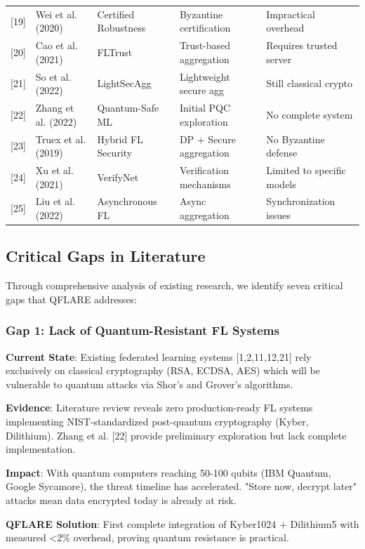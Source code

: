 \documentclass[12pt,a4paper]{article}
\begin{document}
\begin{table}[H]
\begin{tabular}{p{0.8cm}p{3.5cm}p{2.5cm}p{2cm}p{3cm}}
{[}19{]} & Wei et al. (2020) & Certified Robustness & Byzantine certification & Impractical overhead \\
{[}20{]} & Cao et al. (2021) & FLTrust & Trust-based aggregation & Requires trusted server \\
{[}21{]} & So et al. (2022) & LightSecAgg & Lightweight secure agg & Still classical crypto \\
{[}22{]} & Zhang et al. (2022) & Quantum-Safe ML & Initial PQC exploration & No complete system \\
{[}23{]} & Truex et al. (2019) & Hybrid FL Security & DP + Secure aggregation & No Byzantine defense \\
{[}24{]} & Xu et al. (2021) & VerifyNet & Verification mechanisms & Limited to specific models \\
{[}25{]} & Liu et al. (2022) & Asynchronous FL & Async aggregation & Synchronization issues \\
\bottomrule
\end{tabular}
\end{table}

\subsection{Critical Gaps in Literature}

Through comprehensive analysis of existing research, we identify seven critical gaps that QFLARE addresses:

\subsubsection{Gap 1: Lack of Quantum-Resistant FL Systems}

\textbf{Current State}: Existing federated learning systems [1,2,11,12,21] rely exclusively on classical cryptography (RSA, ECDSA, AES) which will be vulnerable to quantum attacks via Shor's and Grover's algorithms.

\textbf{Evidence}: Literature review reveals zero production-ready FL systems implementing NIST-standardized post-quantum cryptography (Kyber, Dilithium). Zhang et al. [22] provide preliminary exploration but lack complete implementation.

\textbf{Impact}: With quantum computers reaching 50-100 qubits (IBM Quantum, Google Sycamore), the threat timeline has accelerated. "Store now, decrypt later" attacks mean data encrypted today is already at risk.

\textbf{QFLARE Solution}: First complete integration of Kyber1024 + Dilithium5 with measured <2\% overhead, proving quantum resistance is practical.
\end{document}

